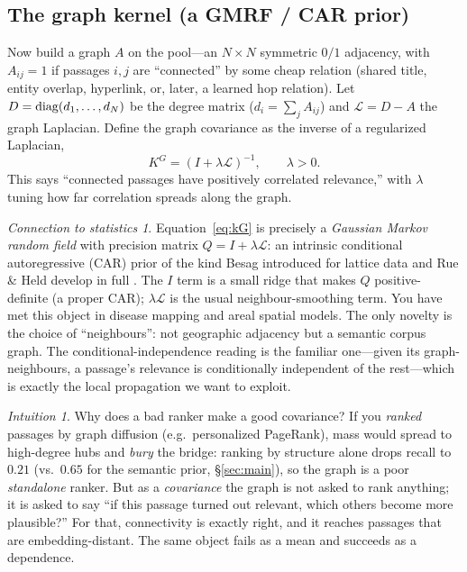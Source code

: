 \documentclass[11pt]{article}
\theoremstyle{plain}
\theoremstyle{definition}
\theoremstyle{remark}
\newtheorem*{intuition}{Intuition}\newtheorem*{stats}{Connection to statistics}\newtheorem*{remark}{Remark}
\begin{document}
\subsection{The graph kernel (a GMRF / CAR prior)}\label{sec:graphkernel}
Now build a graph $A$ on the pool---an $N\times N$ symmetric $0/1$ adjacency, with $A_{ij}=1$ if passages $i,j$ are
``connected'' by some cheap relation (shared title, entity overlap, hyperlink, or, later, a learned hop relation).
Let $D=\mathrm{diag}(d_1,\dots,d_N)$ be the degree matrix ($d_i=\sum_j A_{ij}$) and $\mathcal L = D - A$ the graph
Laplacian. Define the graph covariance as the inverse of a regularized Laplacian,
\begin{equation}
K^{G}=(I+\lambda\mathcal L)^{-1},\qquad \lambda>0.
\label{eq:kG}
\end{equation}
This says ``connected passages have positively correlated relevance,'' with $\lambda$ tuning how far correlation
spreads along the graph.

\begin{stats}
Equation~\eqref{eq:kG} is precisely a \emph{Gaussian Markov random field} with precision matrix
$Q=I+\lambda\mathcal L$: an intrinsic conditional autoregressive (CAR) prior of the kind Besag introduced for
lattice data and Rue \& Held develop in full \citep{besag1974car,rue2005gmrf}. The $I$ term is a small ridge that
makes $Q$ positive-definite (a proper CAR); $\lambda\mathcal L$ is the usual neighbour-smoothing term. You have met
this object in disease mapping and areal spatial models. The only novelty is the choice of ``neighbours'': not
geographic adjacency but a semantic corpus graph. The conditional-independence reading is the familiar one---given
its graph-neighbours, a passage's relevance is conditionally independent of the rest---which is exactly the local
propagation we want to exploit.
\end{stats}

\begin{intuition}
Why does a bad ranker make a good covariance? If you \emph{ranked} passages by graph diffusion (e.g.\ personalized
PageRank), mass would spread to high-degree hubs and \emph{bury} the bridge: ranking by structure alone drops recall to
$0.21$ (vs.\ $0.65$ for the semantic prior, \S\ref{sec:main}), so the graph is a poor \emph{standalone} ranker. But
as a \emph{covariance} the graph is not asked to rank anything; it is asked to say ``if this
passage turned out relevant, which others become more plausible?'' For that, connectivity is exactly right, and it
reaches passages that are embedding-distant. The same object fails as a mean and succeeds as a dependence.
\end{intuition}
\end{document}
